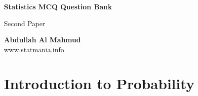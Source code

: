 \documentclass{exam}
\begin{document}
\begin{titlepage}
    \begin{center}
        \vspace*{1cm}
            
        \Huge
        \textbf{Statistics MCQ Question Bank}
            
        \vspace{0.5cm}
        \LARGE
        Second Paper \\


            
        \vspace{1.5cm}
            

            
        \vfill
            
            
        \vspace{0.8cm}
            
                    \textbf{Abdullah Al Mahmud} \\
        \Large
        www.statmania.info\\
            
    \end{center}
\end{titlepage}

\tableofcontents

\newpage

 \section{Introduction to Probability}
\end{document}
